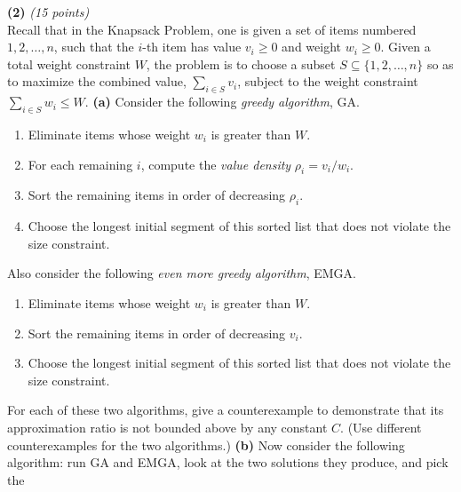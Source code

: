 \documentclass[12pt]{article}
\def\gap{0.1in}
\def\bigap{0.25in}
\begin{document}
\setlength{\parindent}{0in}
\addtolength{\parskip}{0.1cm}
\setlength{\fboxrule}{.5mm}\setlength{\fboxsep}{1.2mm}
\newlength{\boxlength}\setlength{\boxlength}{\textwidth}
\addtolength{\boxlength}{-4mm}
\begin{center}
\end{center}
\vspace{5mm}
\vskip \bigap
{\bf (2)} {\em (15 points)}\\
Recall that in the Knapsack Problem, one is given
a set of items numbered $1,2,\ldots,n$,
such that the $i$-th item has value $v_i \geq 0$
and weight $w_i \geq 0.$  Given a total weight
constraint $W$, the problem is to choose a
subset $S \subseteq \{1,2,\ldots,n\}$ so
as to maximize the combined value, $\sum_{i \in S} v_i$,
subject to the weight constraint $\sum_{i \in S} w_i \leq W.$
\vskip \gap
{\bf (a)}
Consider the following \emph{greedy algorithm}, GA.
\begin{enumerate}
\item Eliminate items whose weight $w_i$ is greater than $W$.
\item For each remaining $i$, 
compute the \emph{value density} $\rho_i = v_i/w_i.$
\item Sort the remaining items in order of decreasing $\rho_i$.
\item Choose the longest initial segment of this sorted list 
that does not violate the size constraint.
\end{enumerate}
Also consider the following
\emph{even more greedy algorithm}, EMGA.
\begin{enumerate}
\item Eliminate items whose weight $w_i$ is greater than $W$.
\item Sort the remaining items in order of decreasing $v_i$.
\item Choose the longest initial segment of this sorted
list that does not violate the size constraint.
\end{enumerate}
For each of these two algorithms, give a
counterexample to demonstrate 
that its approximation ratio 
is not bounded above by any constant $C$.
(Use different counterexamples for the two algorithms.)
\vskip \gap
{\bf (b)}
Now consider the following algorithm: run GA and EMGA,
look at the two solutions they produce, and pick the
\end{document}
